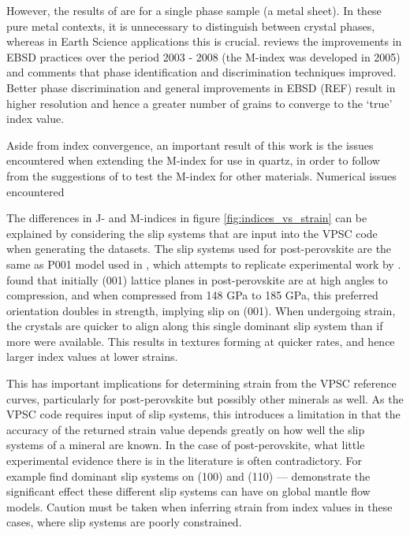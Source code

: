 \documentclass[a4paper,12pt,twoside]{report}
\numberwithin{equation}{chapter}
\begin{document}
However, the results of \cite{Baudin1993} are for a single phase sample (a metal sheet). In these pure metal contexts, it is unnecessary to distinguish between crystal phases, whereas in Earth Science applications this is crucial. \cite{Randle2009} reviews the improvements in EBSD practices over the period 2003 - 2008 (the M-index was developed in 2005) and comments that phase identification and discrimination techniques improved. Better phase discrimination and general improvements in EBSD (REF) result in higher resolution and hence a greater number of grains to converge to the \lq{}true\rq{} index value. 

Aside from index convergence, an important result of this work is the issues encountered when extending the M-index for use in quartz, in order to follow from the suggestions of \cite{Skemer} to test the M-index for other materials. Numerical issues encountered

The differences in J- and M-indices in figure \ref{fig:indices_vs_strain} can be explained by considering the slip systems that are input into the VPSC code when generating the datasets. The slip systems used for post-perovskite are the same as P001 model used in \cite{Walker2012}, which attempts to replicate experimental work by \citep{Miyagi2010}. \cite{Miyagi2010} found that initially (001) lattice planes in post-perovskite are at high angles to compression, and when compressed from 148 GPa to 185 GPa, this preferred orientation doubles in strength, implying slip on (001). When undergoing strain, the crystals are quicker to align along this single dominant slip system than if more were available. This results in textures forming at quicker rates, and hence larger index values at lower strains.

This has important implications for determining strain from the VPSC reference curves, particularly for post-perovskite but possibly other minerals as well. As the VPSC code requires input of slip systems, this introduces a limitation in that the accuracy of the returned strain value depends greatly on how well the slip systems of a mineral are known. In the case of post-perovskite, what little experimental evidence there is in the literature is often contradictory. For example \cite{Merkel2007} find dominant slip systems on (100) and (110) --- \cite{Walker2012} demonstrate the significant effect these different slip systems can have on global mantle flow models. Caution must be taken when inferring strain from index values in these cases, where slip systems are poorly constrained.  
  
\end{document}
